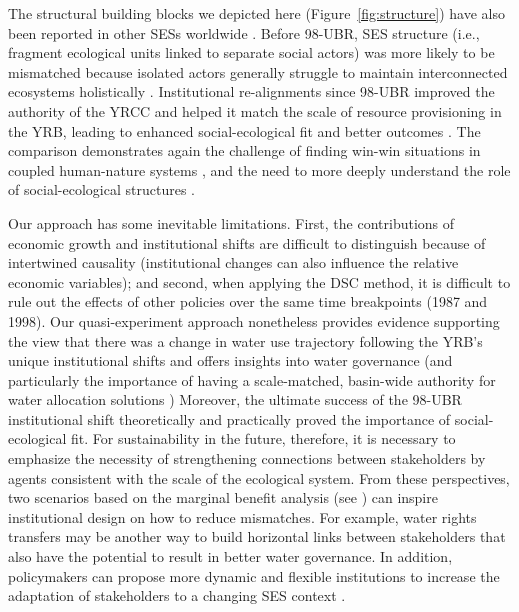\documentclass[default, sn-standardnature]{sn-jnl}
\begin{document}
The structural building blocks we depicted here (Figure~\ref{fig:structure}) have also been reported in other SESs worldwide \cite{kluger2020,guerrero2015,bodin2012}.
Before 98-UBR, SES structure (i.e., fragment ecological units linked to separate social actors) was more likely to be mismatched because isolated actors generally struggle to maintain interconnected ecosystems holistically \cite{sayles2017,sayles2019,cai2016,bergsten2019}.
Institutional re-alignments since 98-UBR improved the authority of the YRCC and helped it match the scale of resource provisioning in the YRB, leading to enhanced social-ecological fit and better outcomes \cite{cumming2020a,wang2019d}.
The comparison demonstrates again the challenge of finding win-win situations in coupled human-nature systems \cite{hegwood2022}, and the need to more deeply understand the role of social-ecological structures \cite{bergsten2019, sayles2019}.


Our approach has some inevitable limitations.
First, the contributions of economic growth and institutional shifts are difficult to distinguish because of intertwined causality (institutional changes can also influence the relative economic variables);
and second, when applying the DSC method, it is difficult to rule out the effects of other policies over the same time breakpoints (1987 and 1998).
Our quasi-experiment approach nonetheless provides evidence supporting the view that there was a change in water use trajectory following the YRB's unique institutional shifts and offers insights into water governance (and particularly the importance of having a scale-matched, basin-wide authority for water allocation solutions \cite{bodin2017b, ostrom2009, reyers2018})
Moreover, the ultimate success of the 98-UBR institutional shift theoretically and practically proved the importance of social-ecological fit.
For sustainability in the future, therefore, it is necessary to emphasize the necessity of strengthening connections between stakeholders by agents consistent with the scale of the ecological system.
From these perspectives, two scenarios based on the marginal benefit analysis (see \textit{}) can inspire institutional design on how to reduce mismatches.
For example, water rights transfers may be another way to build horizontal links between stakeholders that also have the potential to result in better water governance.
In addition, policymakers can propose more dynamic and flexible institutions to increase the adaptation of stakeholders to a changing SES context \cite{reyers2018}.
\end{document}
